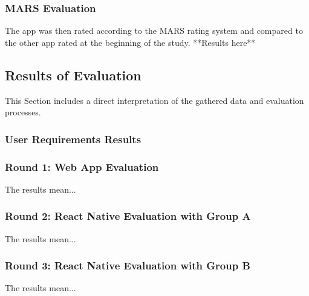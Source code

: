 \subsubsection{MARS Evaluation}
The app was then rated according to the MARS rating system and compared to the other app rated at the beginning of the study. **Results here** 

\subsection{Results of Evaluation}
This Section includes a direct interpretation of the gathered data and evaluation processes. 

\subsubsection{User Requirements Results} 

\subsubsection{Round 1: Web App Evaluation}
The results mean...

\subsubsection{Round 2: React Native Evaluation with Group A}
The results mean...

\subsubsection{Round 3: React Native Evaluation with Group B}
The results mean...
